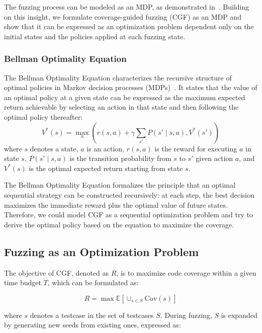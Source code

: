 \documentclass[lettersize,journal]{IEEEtran}
\begin{document}
The fuzzing process can be modeled as an MDP, as demonstrated in~\cite{bottingerDeepReinforcementFuzzing2018}. Building on this insight, we formulate coverage-guided fuzzing (CGF) as an MDP and show that it can be expressed as an optimization problem dependent only on the initial states and the policies applied at each fuzzing state.

\subsubsection{Bellman Optimality Equation}
The Bellman Optimality Equation characterizes the recursive structure of optimal policies in Markov decision processes (MDPs)~\cite{richardbellmanTheoryDynamicProgramming1952,suttonReinforcementLearningSecond2018}. It states that the value of an optimal policy at a given state can be expressed as the maximum expected return achievable by selecting an action in that state and then following the optimal policy thereafter:
\begin{equation}
	V^*(s) = \max_{a}\left( r(s,a) + \gamma \sum_{s'} P(s' \mid s,a), V^*(s') \right)
	\label{eq:bellman_equation}
\end{equation}
where $s$ denotes a state, $a$ is an action, $r(s,a)$ is the reward for executing $a$ in state $s$, $P(s' \mid s,a)$ is the transition probability from $s$ to $s'$ given action $a$, and $V^*(s)$ is the optimal expected return starting from state $s$.

The Bellman Optimality Equation formalizes the principle that an optimal sequential strategy can be constructed recursively: at each step, the best decision maximizes the immediate reward plus the optimal value of future states. Therefore, we could model CGF as a sequential optimization problem and try to derive the optimal policy based on the equation to maximize the coverage.

\subsection{Fuzzing as an Optimization Problem}
The objective of CGF, denoted as $R$, is to maximize code coverage within a given time budget $T$, which can be formulated as:

\begin{equation}
	R = \max \mathbb{E}\left[\cup_{s\in S}\text{Cov}(s)\right]\label{eq:cgf_target}
\end{equation}

where $s$ denotes a testcase in the set of testcases $S$. During fuzzing, $S$ is expanded by generating new seeds from existing ones, expressed as:
\end{document}
